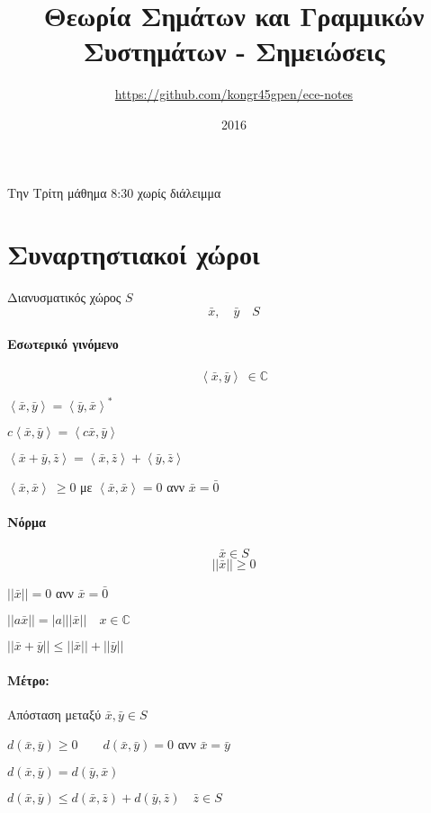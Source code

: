 \documentclass[11pt,a4paper,titlepage,fleqn]{article}
\title{Θεωρία Σημάτων και Γραμμικών Συστημάτων - Σημειώσεις}
\date{2016}
\author{\textlatin{\csuse{no\greek @numbers}\selectlanguage{english} \url{https://github.com/kongr45gpen/ece-notes}}}
\begin{document}
	Την Τρίτη μάθημα 8:30 χωρίς διάλειμμα

	

	\section{Συναρτηστιακοί χώροι}
	Διανυσματικός χώρος \( S \)
	\[
	\bar x,\quad \bar y\quad S
	\]

	\paragraph{Εσωτερικό γινόμενο}
	\[ \left\langle\bar x,\bar y\right\rangle\ \in \mathbb C  \]
	\begin{enumpar}
		\item \( \left\langle\bar x,\bar y\right\rangle
		= \left\langle\bar y,\bar x\right\rangle^* \)
		\item \( c\left\langle\bar x,\bar y\right\rangle
		=\left\langle c\bar x,\bar y\right\rangle \)
		\item \( \left\langle\bar x+\bar y,\bar z\right\rangle
		= \left\langle\bar x,\bar z\right\rangle+\left\langle\bar y,\bar z\right\rangle \)
		\item \( \left\langle\bar x,\bar x\right\rangle \ \geq 0 \) με
		\( \left\langle\bar x,\bar x\right\rangle = 0 \) ανν \( \bar x = \bar 0 \)
	\end{enumpar}

	\paragraph{Νόρμα}
	\[
	\bar x \in S
	\]\[
	||\bar x|| \geq0
	\]
	\begin{enumpar}
		\item \( ||\bar x|| = 0 \) ανν \( \bar x = \bar 0 \)
		\item \( ||a\bar x|| = |a|||\bar x|| \quad x \in\mathbb C \)
		\item \( ||\bar x+\bar y|| \leq ||\bar x|| + ||\bar y|| \)
	\end{enumpar}
	\paragraph{Μέτρο:} Απόσταση μεταξύ \( \bar x,\bar y \in S \)
	\begin{enumpar}
		\item \( d(\bar x,\bar y)\geq 0 \qquad d(\bar x,\bar y)=0 \)
		ανν \( \bar x = \bar y \)
		\item \( d(\bar x,\bar y) = d(\bar y,\bar x) \)
		\item \( d(\bar x,\bar y) \leq d(\bar x,\bar z) + d(\bar y,\bar z)
		\quad \bar z\in S
		 \)

    \end{enumpar}
\end{document}
